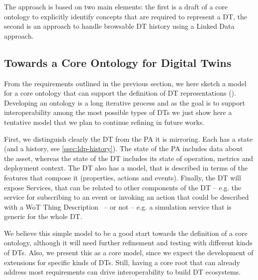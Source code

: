 The approach is based on two main elements: the first is a draft of a core ontology to explicitly identify concepts that are required to represent a DT, the second is an approach to handle browsable DT history using a Linked Data approach.

\subsection{Towards a Core Ontology for Digital Twins}

From the requirements outlined in the previous section, we here sketch a model for a core ontology that can support the definition of DT representations ().
%
Developing an ontology is a long iterative process and as the goal is to support interoperability among the most possible types of DTs we just show here a tentative model that we plan to continue refining in future works.

First, we distinguish clearly the DT from the PA it is mirroring.
Each has a state (and a history, see \cref{ssec:ldp-history}).
The state of the PA includes data about the asset, whereas the state of the DT includes its state of operation, metrics and deployment context.
The DT also has a model, that is described in terms of the features that compose it (properties, actions and events).
Finally, the DT will expose Services, that can be related to other components of the DT -- e.g. the service for subscribing to an event or invoking an action that could be described with a WoT Thing Description~\cite{wotTD} -- or not -- e.g. a simulation service that is generic for the whole DT.

We believe this simple model to be a good start towards the definition of a core ontology, although it will need further refinement and testing with different kinds of DTs.
%
Also, we present this as a core model, since we expect the development of extensions for specific kinds of DTs. Still, having a core root that can already address most requirements can drive interoperability to build DT ecosystems.

